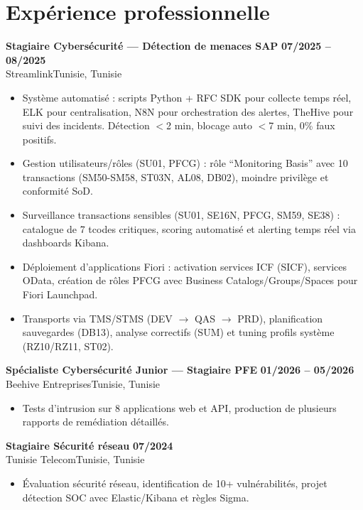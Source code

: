 \documentclass[a4paper,10pt]{article}
\newcommand{\cventry}[4]{\textbf{#1} \hfill \textbf{#4}\\[1pt]#2{\ifx\relax#3\relax\else, #3\fi}\par\vspace{1pt}}
\begin{document}
\section{Expérience professionnelle}
\cventry{Stagiaire Cybersécurité — Détection de menaces SAP}{Streamlink}{Tunisie}{07/2025 -- 08/2025}
\begin{itemize}
  \item Système automatisé : scripts Python + RFC SDK pour collecte temps réel, ELK pour centralisation, N8N pour orchestration des alertes, TheHive pour suivi des incidents. Détection $<$2 min, blocage auto $<$7 min, 0\% faux positifs.
  \item Gestion utilisateurs/rôles (SU01, PFCG) : rôle ``Monitoring Basis'' avec 10 transactions (SM50-SM58, ST03N, AL08, DB02), moindre privilège et conformité SoD.
  \item Surveillance transactions sensibles (SU01, SE16N, PFCG, SM59, SE38) : catalogue de 7 tcodes critiques, scoring automatisé et alerting temps réel via dashboards Kibana.
  \item Déploiement d'applications Fiori : activation services ICF (SICF), services OData, création de rôles PFCG avec Business Catalogs/Groups/Spaces pour Fiori Launchpad.
  \item Transports via TMS/STMS (DEV $\rightarrow$ QAS $\rightarrow$ PRD), planification sauvegardes (DB13), analyse correctifs (SUM) et tuning profils système (RZ10/RZ11, ST02).
\end{itemize}
\cventry{Spécialiste Cybersécurité Junior --- Stagiaire PFE}{Beehive Entreprises}{Tunisie}{01/2026 -- 05/2026}
\begin{itemize}
  \item Tests d'intrusion sur 8 applications web et API, production de plusieurs rapports de remédiation détaillés.
\end{itemize}
\cventry{Stagiaire Sécurité réseau}{Tunisie Telecom}{Tunisie}{07/2024}
\begin{itemize}
  \item Évaluation sécurité réseau, identification de 10+ vulnérabilités, projet détection SOC avec Elastic/Kibana et règles Sigma.
\end{itemize}
\end{document}
